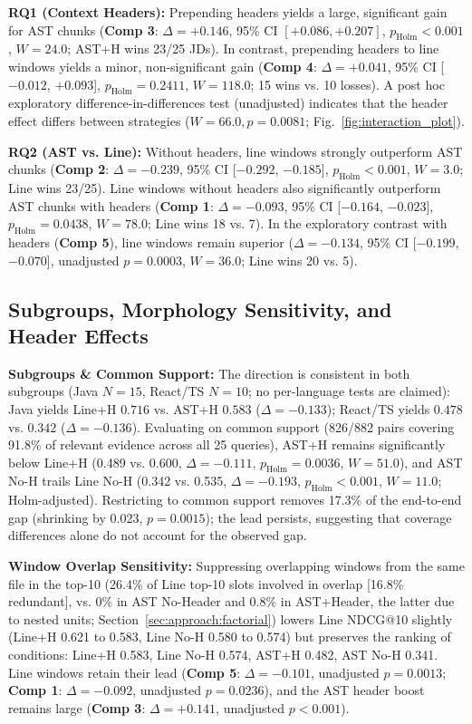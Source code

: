 

\textbf{RQ1 (Context Headers):} Prepending headers yields a large, significant gain for AST chunks (\textbf{Comp 3}: $\Delta = +0.146$, 95\% CI $[+0.086, +0.207]$, $p_{\mathrm{Holm}} < 0.001$, $W = 24.0$; AST+H wins 23/25 JDs). In contrast, prepending headers to line windows yields a minor, non-significant gain (\textbf{Comp 4}: $\Delta = +0.041$, 95\% CI [$-0.012$, $+0.093$], $p_{\mathrm{Holm}} = 0.2411$, $W = 118.0$; 15 wins vs. 10 losses). A post hoc exploratory difference-in-differences test (unadjusted) indicates that the header effect differs between strategies ($W = 66.0, p = 0.0081$; Fig.~\ref{fig:interaction_plot}).

\textbf{RQ2 (AST vs. Line):} Without headers, line windows strongly outperform AST chunks (\textbf{Comp 2}: $\Delta = -0.239$, 95\% CI [$-0.292$, $-0.185$], $p_{\mathrm{Holm}} < 0.001$, $W = 3.0$; Line wins 23/25). Line windows without headers also significantly outperform AST chunks with headers (\textbf{Comp 1}: $\Delta = -0.093$, 95\% CI [$-0.164$, $-0.023$], $p_{\mathrm{Holm}} = 0.0438$, $W = 78.0$; Line wins 18 vs. 7). In the exploratory contrast with headers (\textbf{Comp 5}), line windows remain superior ($\Delta = -0.134$, 95\% CI [$-0.199$, $-0.070$], unadjusted $p = 0.0003$, $W = 36.0$; Line wins 20 vs. 5).

\subsection{Subgroups, Morphology Sensitivity, and Header Effects}
\label{sec:results:sensitivity}
\textbf{Subgroups \& Common Support:} The direction is consistent in both subgroups (Java $N=15$, React/TS $N=10$; no per-language tests are claimed): Java yields Line+H $0.716$ vs. AST+H $0.583$ ($\Delta = -0.133$); React/TS yields $0.478$ vs. $0.342$ ($\Delta = -0.136$). 
Evaluating on common support (826/882 pairs covering 91.8\% of relevant evidence across all 25 queries), AST+H remains significantly below Line+H (0.489 vs. 0.600, $\Delta = -0.111$, $p_{\mathrm{Holm}} = 0.0036$, $W = 51.0$), and AST No-H trails Line No-H (0.342 vs. 0.535, $\Delta = -0.193$, $p_{\mathrm{Holm}} < 0.001$, $W = 11.0$; Holm-adjusted). Restricting to common support removes 17.3\% of the end-to-end gap (shrinking by 0.023, $p = 0.0015$); the lead persists, suggesting that coverage differences alone do not account for the observed gap.

\textbf{Window Overlap Sensitivity:} Suppressing overlapping windows from the same file in the top-10 (26.4\% of Line top-10 slots involved in overlap [16.8\% redundant], vs. 0\% in AST No-Header and 0.8\% in AST+Header, the latter due to nested units; Section~\ref{sec:approach:factorial}) lowers Line NDCG@10 slightly (Line+H 0.621 to 0.583, Line No-H 0.580 to 0.574) but preserves the ranking of conditions: Line+H 0.583, Line No-H 0.574, AST+H 0.482, AST No-H 0.341. Line windows retain their lead (\textbf{Comp 5}: $\Delta = -0.101$, unadjusted $p = 0.0013$; \textbf{Comp 1}: $\Delta = -0.092$, unadjusted $p = 0.0236$), and the AST header boost remains large (\textbf{Comp 3}: $\Delta = +0.141$, unadjusted $p < 0.001$).

